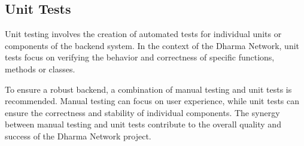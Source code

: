 \subsection{Unit Tests}
Unit testing involves the creation of automated tests for individual units or components of the backend system. In the context of the Dharma Network, unit tests focus on verifying the behavior and correctness of specific functions, methods or classes.\newline
\begin{comment}
    Benefits of Unit Tests:

\begin{itemize}
    \item \textit{Automation:} Unit tests can be automated, allowing for faster and more frequent execution compared to manual testing. This enables developers to catch regressions early and maintain the stability of the backend system.
    \item \textit{Targeted Testing:} Unit tests provide targeted testing at the granular level, allowing for the identification of specific issues within isolated components. This helps in isolating and debugging problems, leading to more efficient troubleshooting.
    \item \textit{Test Coverage:} Unit tests facilitate higher test coverage by systematically examining individual components. Developers can create multiple test cases to cover various scenarios, ensuring a thorough examination of the backend system.
\end{itemize}

Limitations of Unit Tests:

\begin{itemize}
    \item \textit{Limited Scope:} Unit tests focus on individual units or components, meaning that they may not capture the interactions and dependencies between different parts of the backend system. Integration testing is required to validate the interactions and collaborations between these units.
    \item \textit{Incomplete System Validation:} Unit tests alone cannot provide a complete validation of the entire backend system. While they ensure the correctness of individual units, they may not uncover issues that arise from the integration of these units.
\end{itemize}
\end{comment}

To ensure a robust backend, a combination of manual testing and unit tests is recommended. Manual testing can focus on user experience, while unit tests can ensure the correctness and stability of individual components. The synergy between manual testing and unit tests contribute to the overall quality and success of the Dharma Network project.\newline

